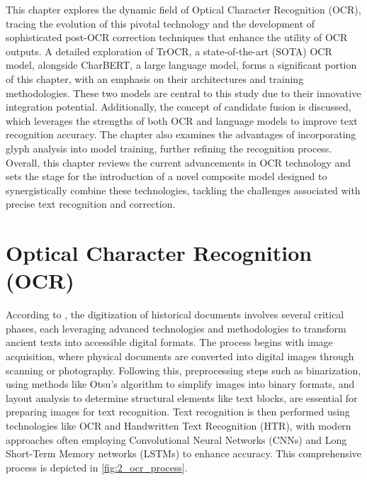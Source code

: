 \label{chap:2_related_work}
This chapter explores the dynamic field of Optical Character Recognition (OCR), tracing the evolution of this pivotal technology and the development of sophisticated post-OCR correction techniques that enhance the utility of OCR outputs. A detailed exploration of TrOCR, a state-of-the-art (SOTA) OCR model, alongside CharBERT, a large language model, forms a significant portion of this chapter, with an emphasis on their architectures and training methodologies. These two models are central to this study due to their innovative integration potential. Additionally, the concept of candidate fusion is discussed, which leverages the strengths of both OCR and language models to improve text recognition accuracy. The chapter also examines the advantages of incorporating glyph analysis into model training, further refining the recognition process. Overall, this chapter reviews the current advancements in OCR technology and sets the stage for the introduction of a novel composite model designed to synergistically combine these technologies, tackling the challenges associated with precise text recognition and correction.

\section{Optical Character Recognition (OCR)}
\label{sec:2_ocr}
According to \cite{philips2020historical}, the digitization of historical documents involves several critical phases, each leveraging advanced technologies and methodologies to transform ancient texts into accessible digital formats. The process begins with image acquisition, where physical documents are converted into digital images through scanning or photography. Following this, preprocessing steps such as binarization, using methods like Otsu’s algorithm \citep{liu2009otsu} to simplify images into binary formats, and layout analysis to determine structural elements like text blocks, are essential for preparing images for text recognition. Text recognition is then performed using technologies like OCR and Handwritten Text Recognition (HTR), with modern approaches often employing Convolutional Neural Networks (CNNs) \citep{zhang2017cnn} and Long Short-Term Memory networks (LSTMs) \citep{breuel2013high} to enhance accuracy. This comprehensive process is depicted in \autoref{fig:2_ocr_process}.



